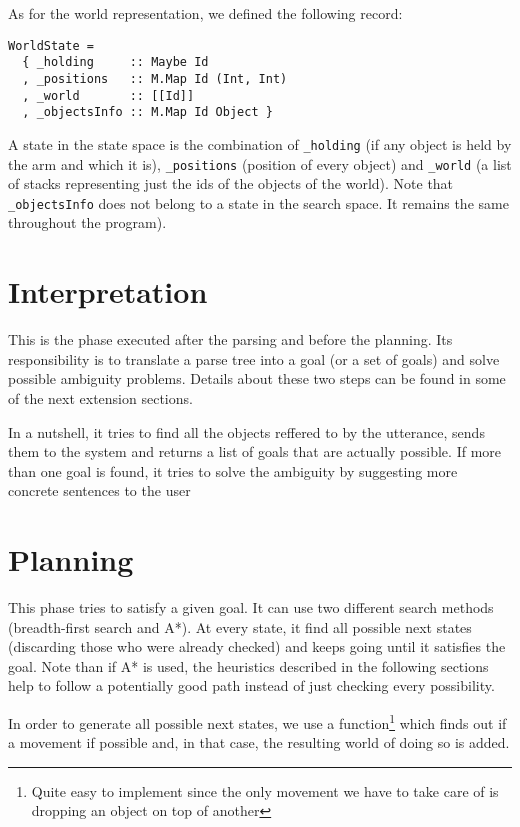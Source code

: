 \documentclass[11pt]{article}
\begin{document}
As for the world representation, we defined the following record:
\begin{lstlisting}
WorldState = 
  { _holding     :: Maybe Id
  , _positions   :: M.Map Id (Int, Int)
  , _world       :: [[Id]]
  , _objectsInfo :: M.Map Id Object } 
\end{lstlisting}

A state in the state space is the combination of \texttt{\_holding} (if any 
object is held by the arm and which it is), \texttt{\_positions} (position of every 
object) and \texttt{\_world} (a list of stacks representing just the ids of the 
objects of the world). Note that \texttt{\_objectsInfo} does not belong to a 
state in the search space.
It remains the same throughout the program).
  
  \section{Interpretation}
  This is the phase executed after the parsing and before the planning. Its 
  responsibility is to translate a parse tree into a goal (or a set of goals) 
  and solve possible ambiguity problems. Details about these two steps can be 
  found in some of the next extension sections.

  In a nutshell, it tries to find all the objects reffered to by the utterance, 
  sends them to the system and returns a list of goals that are actually 
  possible. If more than one goal is found, it tries to solve the ambiguity by 
  suggesting more concrete sentences to the user 


  \section{Planning}
  This phase tries to satisfy a given goal. It can use two 
  different search methods (breadth-first search and A*). At every state, it 
  find all possible next states (discarding those who were already checked) and 
  keeps going until it satisfies the goal. Note than if A* is used, the 
  heuristics described in the following sections help to follow a potentially good 
  path instead of just checking every possibility.

  In order to generate all possible next states, we use a 
  function\footnote{Quite easy to implement since the only movement we have to 
  take care of is dropping an object on top of another} which finds out if a 
  movement if possible and, in that case, the resulting world of doing so is 
  added.
\end{document}
